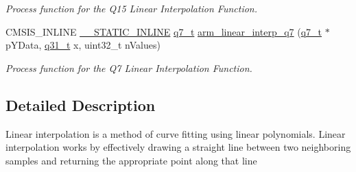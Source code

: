 \begin{DoxyCompactItemize}
\begin{DoxyCompactList}\small\item\em Process function for the Q15 Linear Interpolation Function. \end{DoxyCompactList}\item 
C\+M\+S\+I\+S\+\_\+\+I\+N\+L\+I\+NE \mbox{\hyperlink{cmsis__iccarm_8h_aba87361bfad2ae52cfe2f40c1a1dbf9c}{\+\_\+\+\_\+\+S\+T\+A\+T\+I\+C\+\_\+\+I\+N\+L\+I\+NE}} \mbox{\hyperlink{arm__math_8h_ae541b6f232c305361e9b416fc9eed263}{q7\+\_\+t}} \mbox{\hyperlink{group___linear_interpolate_gaab750789ec9230e65c3bf544029d246f}{arm\+\_\+linear\+\_\+interp\+\_\+q7}} (\mbox{\hyperlink{arm__math_8h_ae541b6f232c305361e9b416fc9eed263}{q7\+\_\+t}} $\ast$p\+Y\+Data, \mbox{\hyperlink{arm__math_8h_adc89a3547f5324b7b3b95adec3806bc0}{q31\+\_\+t}} x, uint32\+\_\+t n\+Values)
\begin{DoxyCompactList}\small\item\em Process function for the Q7 Linear Interpolation Function. \end{DoxyCompactList}\end{DoxyCompactItemize}


\subsection{Detailed Description}
Linear interpolation is a method of curve fitting using linear polynomials. Linear interpolation works by effectively drawing a straight line between two neighboring samples and returning the appropriate point along that line

